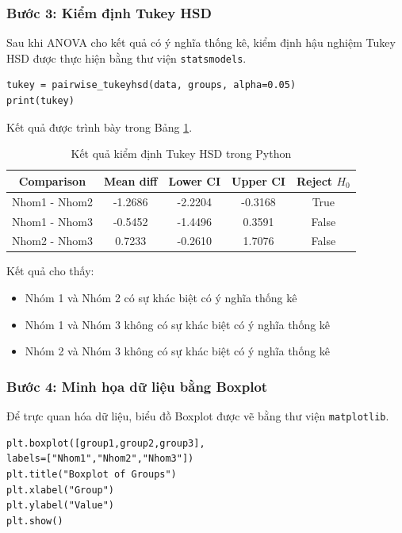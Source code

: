 \subsubsection*{Bước 3: Kiểm định Tukey HSD}

Sau khi ANOVA cho kết quả có ý nghĩa thống kê, kiểm định hậu nghiệm
Tukey HSD được thực hiện bằng thư viện \texttt{statsmodels}.

\begin{verbatim}
tukey = pairwise_tukeyhsd(data, groups, alpha=0.05)
print(tukey)
\end{verbatim}

Kết quả được trình bày trong Bảng \ref{tab:python_tukey}.

\begin{table}[!htp]
\centering
\caption{Kết quả kiểm định Tukey HSD trong Python}
\label{tab:python_tukey}
\begin{tabular}{|c|c|c|c|c|}
\hline
Comparison & Mean diff & Lower CI & Upper CI & Reject $H_0$ \\
\hline
Nhom1 - Nhom2 & -1.2686 & -2.2204 & -0.3168 & True \\
Nhom1 - Nhom3 & -0.5452 & -1.4496 & 0.3591 & False \\
Nhom2 - Nhom3 & 0.7233 & -0.2610 & 1.7076 & False \\
\hline
\end{tabular}
\end{table}

Kết quả cho thấy:

\begin{itemize}
\item Nhóm 1 và Nhóm 2 có sự khác biệt có ý nghĩa thống kê
\item Nhóm 1 và Nhóm 3 không có sự khác biệt có ý nghĩa thống kê
\item Nhóm 2 và Nhóm 3 không có sự khác biệt có ý nghĩa thống kê
\end{itemize}

\subsubsection*{Bước 4: Minh họa dữ liệu bằng Boxplot}

Để trực quan hóa dữ liệu, biểu đồ Boxplot được vẽ bằng thư viện
\texttt{matplotlib}.

\begin{verbatim}
plt.boxplot([group1,group2,group3],
labels=["Nhom1","Nhom2","Nhom3"])
plt.title("Boxplot of Groups")
plt.xlabel("Group")
plt.ylabel("Value")
plt.show()
\end{verbatim}

